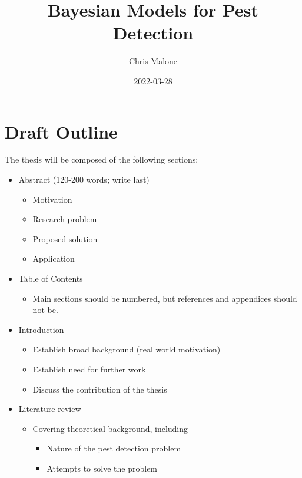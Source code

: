 \documentclass[
]{book}
\title{Bayesian Models for Pest Detection}
\author{Chris Malone}
\date{2022-03-28}
\providecommand{\tightlist}{%
  \setlength{\itemsep}{0pt}\setlength{\parskip}{0pt}}
\begin{document}
\maketitle

{
\setcounter{tocdepth}{1}
\tableofcontents
}
\hypertarget{draft-outline}{%
\chapter*{Draft Outline}\label{draft-outline}}

The thesis will be composed of the following sections:

\begin{itemize}
\tightlist
\item
  Abstract (120-200 words; write last)

  \begin{itemize}
  \tightlist
  \item
    Motivation
  \item
    Research problem
  \item
    Proposed solution
  \item
    Application\\
  \end{itemize}
\item
  Table of Contents

  \begin{itemize}
  \tightlist
  \item
    Main sections should be numbered, but references and appendices should not be.
  \end{itemize}
\item
  Introduction

  \begin{itemize}
  \tightlist
  \item
    Establish broad background (real world motivation)
  \item
    Establish need for further work
  \item
    Discuss the contribution of the thesis
  \end{itemize}
\item
  Literature review

  \begin{itemize}
  \tightlist
  \item
    Covering theoretical background, including

    \begin{itemize}
    \tightlist
    \item
      Nature of the pest detection problem
    \item
      Attempts to solve the problem


\end{itemize}
\end{itemize}
\end{itemize}
\end{document}
